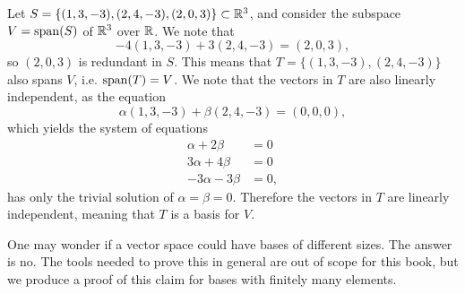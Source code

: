 \begin{example}
    Let $S = \{(1, 3, -3), (2, 4, -3), (2, 0, 3)\} \subset \mathbb{R}^3$, and consider the subspace $V = \mathrm{span}(S)$ of $\mathbb{R}^3$ over $\mathbb{R}$. We note that
    \[
        -4(1, 3, -3) + 3(2, 4, -3) = (2, 0, 3),
    \]
    so $(2, 0, 3)$ is redundant in $S$. This means that $T = \{(1, 3, -3), (2, 4, -3)\}$ also spans $V$, i.e. $\mathrm{span}(T) = V$. We note that the vectors in $T$ are also linearly independent, as the equation
    \[
        \alpha(1, 3, -3) + \beta(2, 4, -3) = (0, 0, 0),
    \]
    which yields the system of equations
    \begin{align*}
        \alpha + 2\beta &= 0\\
        3\alpha + 4\beta &= 0\\
        -3\alpha - 3\beta &= 0,
    \end{align*}
    has only the trivial solution of $\alpha = \beta = 0$. Therefore the vectors in $T$ are linearly independent, meaning that $T$ is a basis for $V$.
\end{example}

One may wonder if a vector space could have bases of different sizes. The answer is no. The tools needed to prove this in general are out of scope for this book, but we produce a proof of this claim for bases with finitely many elements.

